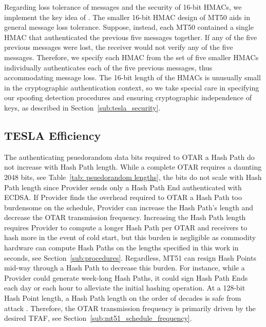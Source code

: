 \documentclass[letterpaper,times]{IONconf/IONconf}
\begin{document}
		Regarding loss tolerance of messages and the security of 16-bit HMACs, we implement the key idea of \cite{Neish_Dissertation}.
		The smaller 16-bit HMAC design of MT50 aids in general message loss tolerance.
		Suppose, instead, each MT50 contained a single HMAC that authenticated the previous five messages together.
		If any of the five previous messages were lost, the receiver would not verify any of the five messages.
		Therefore, we specify each HMAC from the set of five smaller HMACs individually authenticates each of the five previous messages, thus accommodating message loss.
		The 16-bit length of the HMACs is unusually small in the cryptographic authentication context, so we take special care in specifying our spoofing detection procedures and ensuring cryptographic independence of keys, as described in Section~\ref{sub:tesla_security}.

	\subsection{TESLA Efficiency} \label{sub:tesla_efficiency}

		The authenticating psuedorandom data bits required to OTAR a Hash Path do not increase with Hash Path length.
		While a complete OTAR requires a daunting 2048 bits, see Table~\ref{tab: psuedorandom lengths}, the bits do not scale with Hash Path length since Provider sends only a Hash Path End authenticated with ECDSA.
		If Provider finds the overhead required to OTAR a Hash Path too burdensome on the schedule, Provider can increase the Hash Path's length and decrease the OTAR transmission frequency.
		Increasing the Hash Path length requires Provider to compute a longer Hash Path per OTAR and receivers to hash more in the event of cold start, but this burden is negligible as commodity hardware can compute Hash Paths on the lengths specified in this work in seconds, see Section~\ref{sub:procedures}.
		Regardless, MT51 can resign Hash Points mid-way through a Hash Path to decrease this burden.
		For instance, while a Provider could generate week-long Hash Paths, it could sign Hash Path Ends each day or each hour to alleviate the initial hashing operation.
		At a 128-bit Hash Point length, a Hash Path length on the order of decades is safe from attack \cite{Neish_Dissertation}.
		Therefore, the OTAR transmission frequency is primarily driven by the desired TFAF, see Section~\ref{sub:mt51_schedule_frequency}.
\end{document}
